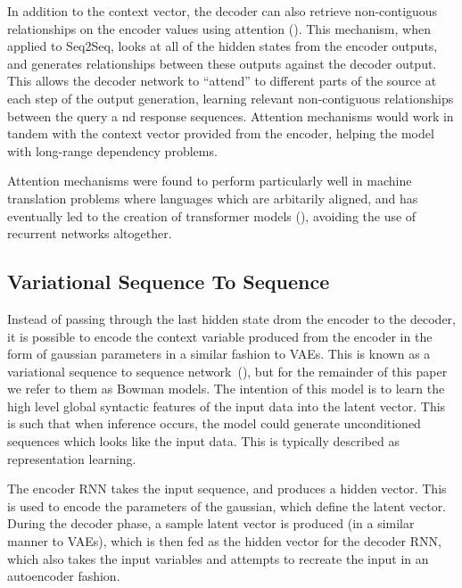 \documentclass[12pt,twoside]{report}
\begin{document}

In addition to the context vector, the decoder can also retrieve non-contiguous relationships on the encoder values using attention (\cite{bahdanau_neural_2014}). This mechanism, when applied to Seq2Seq,  looks at all of the hidden states from the encoder outputs, and generates  relationships between these outputs against the decoder output. This allows the decoder network to ``attend'' to different parts of the source at each step of the output generation, learning relevant non-contiguous relationships between the query a nd response sequences. Attention mechanisms would work in tandem with the context vector provided from the encoder, helping the model with long-range dependency problems.

Attention mechanisms were found to perform particularly well in machine translation problems where languages which are arbitarily aligned, and has eventually led to the creation of transformer models (\cite{vaswani_attention_2017}), avoiding the use of recurrent networks altogether.

\subsection{Variational Sequence To Sequence}
\label{variational_context}

Instead of passing through the last hidden state drom the encoder to the decoder, it is possible to encode the context variable produced from the encoder in the form of gaussian parameters in a similar fashion to VAEs. This is known as a variational sequence to sequence network (\cite{bowman_generating_2015}), but for the remainder of this paper we refer to them as Bowman models. The intention of this model is to learn the high level global syntactic features of the input data into the latent vector. This is such that when inference occurs, the model could generate unconditioned sequences which looks like the input data. This is typically described as representation learning.

The encoder RNN takes the input sequence, and produces a hidden vector. This is used to encode the parameters of the gaussian, which define the latent vector. During the decoder phase, a sample latent vector is produced (in a similar manner to VAEs), which is then fed as the hidden vector for the decoder RNN, which also takes the input variables and attempts to recreate the input in an autoencoder fashion.

\end{document}
